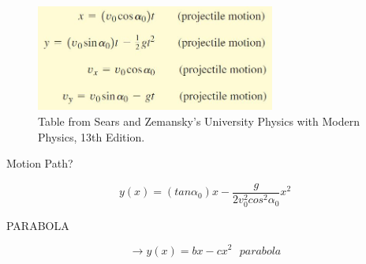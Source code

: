 \documentclass[]{beamer}
\begin{document}


\begin{frame}
   
  
    \begin{figure}[h!]  
        \includegraphics[width=0.7\textwidth]{images/21.jpg}
         \caption{ {\tiny Table from Sears and Zemansky's University Physics 
         with Modern Physics, 13th Edition.} }
      \end{figure}
       

    
  
  \end{frame}






\begin{frame}
   
    Motion Path?
   \pause

       \begin{equation*}
           y(x)=(tan \alpha_0)x-\frac{g}{2v^2_0cos^2\alpha_0}x^2
           \end{equation*}
   
    \pause     

  PARABOLA

    \pause     


 \begin{equation*}
     \rightarrow      y(x)=bx-cx^2 \ \ \ parabola
\end{equation*}
     
     \end{frame}


\end{document}

